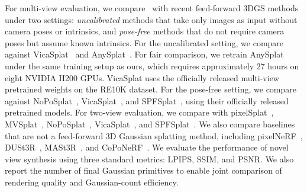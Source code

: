 For multi-view evaluation, we compare \OURMODEL\ with recent feed-forward 3DGS methods under two settings: \textit{uncalibrated} methods that take only images as input without camera poses or intrinsics, and \textit{pose-free} methods that do not require camera poses but assume known intrinsics. 
For the uncalibrated setting, we compare against VicaSplat~\cite{li2025vicasplat} and AnySplat~\cite{jiang2025anysplat}. For fair comparison, we retrain AnySplat under the same training setup as ours, which requires approximately 27 hours on eight NVIDIA H200 GPUs. VicaSplat uses the officially released multi-view pretrained weights on the RE10K dataset. 
For the pose-free setting, we compare against NoPoSplat~\cite{ye2024nopo}, VicaSplat~\cite{li2025vicasplat}, and SPFSplat~\cite{huang2025spfsplat}, using their officially released pretrained models.
For two-view evaluation, we compare with pixelSplat~\cite{charatan2024pixelsplat}, MVSplat~\cite{chen2024mvsplat}, NoPoSplat~\cite{ye2024nopo}, VicaSplat~\cite{li2025vicasplat}, and SPFSplat~\cite{huang2025spfsplat}. We also compare baselines that are not a feed-forward 3D Gaussian splatting method, including pixelNeRF~\cite{yu2021pixelnerf}, DUSt3R~\cite{wang2024dust3r}, MASt3R~\cite{leroy2024mast3r}, and CoPoNeRF~\cite{hong2023coponerf}.
We evaluate the performance of novel view synthesis using three standard metrics: LPIPS, SSIM, and PSNR. We also report the number of final Gaussian primitives to enable joint comparison of rendering quality and Gaussian-count efficiency.
\vspace{-10pt}








